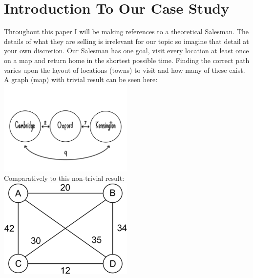 \documentclass[12pt]{report}
\begin{document}
\section{Introduction To Our Case Study}
Throughout this paper I will be making references to a theoretical Salesman.
The details of what they are selling is irrelevant for our topic so imagine that detail at your own discretion.
Our Salesman has one goal, visit every location at least once on a map and return home in the shortest possible time.
Finding the correct path varies upon the layout of locations (towns) to visit and how many of these exist.
\vspace{1cm}
A graph (map) with trivial result can be seen here:\\
\includegraphics[width=0.5\textwidth]{trivialTSP.png}\\
\vspace{0.5cm}
Comparatively to this non-trivial result:\\
\includegraphics[width=0.5\textwidth]{HarderTSP.png}
\end{document}
